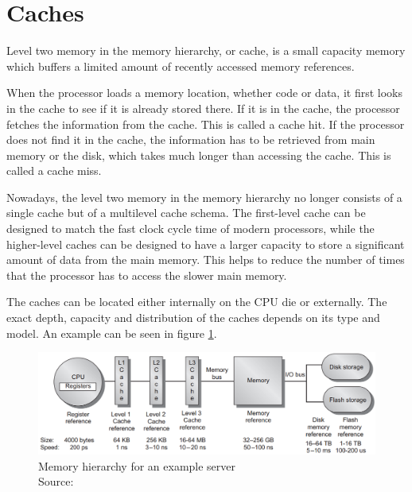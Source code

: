 \section{Caches}

Level two memory in the memory hierarchy, or cache, is a small capacity memory which buffers a limited amount of recently accessed memory references. \cite[p. 94]{threeeasy} \cite[p. 23]{brendan}

When the processor loads a memory location, whether code or data, it first looks in the cache to see if it is already stored there. If it is in the cache, the processor fetches the information from the cache. This is called a cache hit. If the processor does not find it in the cache, the information has to be retrieved from main memory or the disk, which takes much longer than accessing the cache. This is called a cache miss. \cite[p. 2]{quantivapproach-ApB} \cite[p. 128]{computerarch}

Nowadays, the level two memory in the memory hierarchy no longer consists of a single cache but of a multilevel cache schema. The first-level cache can be designed to match the fast clock cycle time of modern processors, while the higher-level caches can be designed to have a larger capacity to store a significant amount of data from the main memory. This helps to reduce the number of times that the processor has to access the slower main memory. \cite[p. 78-83]{quantivapproach} 

The caches can be located either internally on the CPU die or externally. The exact depth, capacity and distribution of the caches depends on its type and model. \cite[p. 231-232]{brendan} An example can be seen in figure \ref{fig:cachehierarch}.


\vspace{.5cm}
\begin{figure}[H]
    \centering
    \includegraphics[width=\textwidth]{images/3_basics/caches.png}
    \caption{Memory hierarchy for an example server\\Source: \cite[p. 79]{quantivapproach}}
    \label{fig:cachehierarch}
    \vspace{-\baselineskip}
\end{figure}

